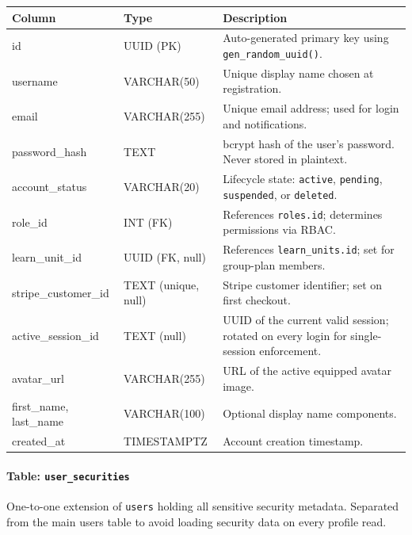 \begin{longtable}{|p{4.2cm}|p{3cm}|p{6.8cm}|}
\hline \textbf{Column} & \textbf{Type} & \textbf{Description} \\ \hline
id & UUID (PK) & Auto-generated primary key using \texttt{gen\_random\_uuid()}. \\ \hline
username & VARCHAR(50) & Unique display name chosen at registration. \\ \hline
email & VARCHAR(255) & Unique email address; used for login and notifications. \\ \hline
password\_hash & TEXT & bcrypt hash of the user's password. Never stored in plaintext. \\ \hline
account\_status & VARCHAR(20) & Lifecycle state: \texttt{active}, \texttt{pending}, \texttt{suspended}, or \texttt{deleted}. \\ \hline
role\_id & INT (FK) & References \texttt{roles.id}; determines permissions via RBAC. \\ \hline
learn\_unit\_id & UUID (FK, null) & References \texttt{learn\_units.id}; set for group-plan members. \\ \hline
stripe\_customer\_id & TEXT (unique, null) & Stripe customer identifier; set on first checkout. \\ \hline
active\_session\_id & TEXT (null) & UUID of the current valid session; rotated on every login for single-session enforcement. \\ \hline
avatar\_url & VARCHAR(255) & URL of the active equipped avatar image. \\ \hline
first\_name, last\_name & VARCHAR(100) & Optional display name components. \\ \hline
created\_at & TIMESTAMPTZ & Account creation timestamp. \\ \hline
\end{longtable}

\paragraph{Table: \texttt{user\_securities}}
One-to-one extension of \texttt{users} holding all sensitive security metadata. Separated from the main users table to avoid loading security data on every profile read.

